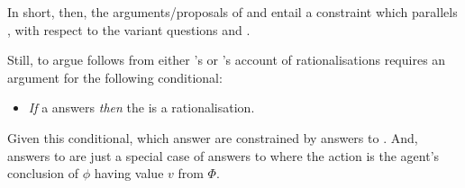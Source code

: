 \begin{note}
  In short, then, the arguments/proposals of \citeauthor{Davidson:1963aa} and \citeauthor{Hieronymi:2011aa} entail a constraint which parallels \issueInclusion{}, with respect to the variant questions \qWhyR{} and \qHowR{}.

  Still, to argue \issueInclusion{} follows from either \citeauthor{Davidson:1963aa}'s or \citeauthor{Hieronymi:2011aa}'s account of rationalisations requires an argument for the following conditional:
  \begin{itemize}
  \item
    \emph{If} a \ros{} answers \qWhy{} \emph{then} the \ros{} is a rationalisation.
  \end{itemize}
  Given this conditional, \ros{} which answer \qWhy{} are constrained by answers to \qHowR{}.
  And, answers to \qHow{} are just a special case of answers to \qHowR{} where the action is the agent's conclusion of \(\phi\) having value \(v\) from \(\Phi\).
\end{note}

